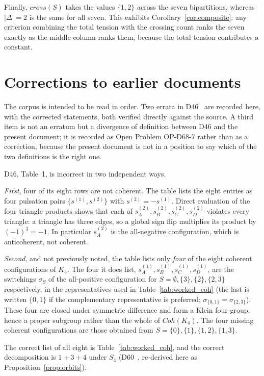 \documentclass[11pt,a4paper]{article}
\def\mathrm#1{#1}%
\newcommand{\Kfour}{K_4}
\newcommand{\Coh}{\mathrm{Coh}}
\newcommand{\cross}{\mathrm{cross}}
\begin{document}
Finally, $\cross(S)$ takes the values $\{1,2\}$ across the seven bipartitions, whereas $|\Delta|=2$ is the same for all seven. This exhibits Corollary~\ref{cor:composite}: any criterion combining the total tension with the crossing count ranks the seven exactly as the middle column ranks them, because the total tension contributes a constant.

\section{Corrections to earlier documents}
\label{sec:corrections}

The corpus is intended to be read in order. Two errata in D46~\citep{D46} are recorded here, with the corrected statements, both verified directly against the source. A third item is not an erratum but a divergence of definition between D46 and the present document; it is recorded as Open Problem OP-D68-7 rather than as a correction, because the present document is not in a position to say which of the two definitions is the right one.

\begin{errbox}
D46, Table~1, is incorrect in two independent ways.

\emph{First}, four of its eight rows are not coherent. The table lists the eight entries as four pulsation pairs $\{s^{(1)},s^{(2)}\}$ with $s^{(2)}=-s^{(1)}$. Direct evaluation of the four triangle products shows that each of $s^{(2)}_A,s^{(2)}_B,s^{(2)}_C,s^{(2)}_D$ violates every triangle: a triangle has three edges, so a global sign flip multiplies its product by $(-1)^3=-1$. In particular $s^{(2)}_A$ is the all-negative configuration, which is anticoherent, not coherent.

\emph{Second}, and not previously noted, the table lists only \emph{four} of the eight coherent configurations of $\Kfour$. The four it does list, $s^{(1)}_A,s^{(1)}_B,s^{(1)}_C,s^{(1)}_D$, are the switchings $\sigma_S$ of the all-positive configuration for $S=\emptyset,\{3\},\{2\},\{2,3\}$ respectively, in the representatives used in Table~\ref{tab:worked_coh} (the last is written $\{0,1\}$ if the complementary representative is preferred; $\sigma_{\{0,1\}}=\sigma_{\{2,3\}}$). These four are closed under symmetric difference and form a Klein four-group, hence a proper subgroup rather than the whole of $\Coh(\Kfour)$. The four missing coherent configurations are those obtained from $S=\{0\},\{1\},\{1,2\},\{1,3\}$.

The correct list of all eight is Table~\ref{tab:worked_coh}, and the correct decomposition is $1+3+4$ under $S_4$ (D60~\citep{D60}, re-derived here as Proposition~\ref{prop:orbits}).
\end{errbox}
\end{document}
